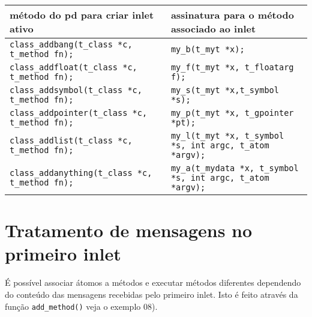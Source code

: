 \begin{center}
\begin{tabular}{|l|l|}
\hline
método do pd para criar inlet ativo & assinatura para o método associado ao
inlet \\
\hline
\texttt{class\_addbang(t\_class *c, t\_method fn);} 	& \texttt{my\_b(t\_myt *x);} \\
\texttt{class\_addfloat(t\_class *c, t\_method fn);}	& \texttt{my\_f(t\_myt *x, t\_floatarg f);} \\
\texttt{class\_addsymbol(t\_class *c, t\_method fn);}	& \texttt{my\_s(t\_myt *x,t\_symbol *s);} \\
\texttt{class\_addpointer(t\_class *c, t\_method fn);}	& \texttt{my\_p(t\_myt *x, t\_gpointer *pt);} \\
\texttt{class\_addlist(t\_class *c, t\_method fn);}	& \texttt{my\_l(t\_myt *x, t\_symbol *s, int argc, t\_atom *argv);} \\
\texttt{class\_addanything(t\_class *c, t\_method fn);}	& \texttt{my\_a(t\_mydata *x, t\_symbol *s, int argc, t\_atom *argv);} \\
\hline
\end{tabular}
\end{center}

\section{Tratamento de mensagens no primeiro inlet}

É possível associar átomos a métodos e executar métodos diferentes dependendo
do conteúdo das mensagens recebidas pelo primeiro inlet. Isto é feito através da
função \texttt{add\_method()} veja o exemplo 08).


